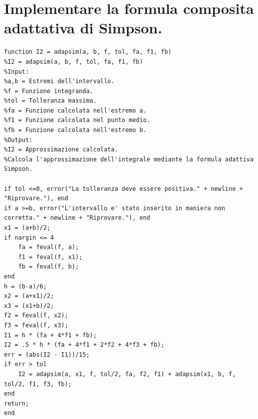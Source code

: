 \documentclass[10pt,a4paper]{article}
\begin{document}
\section{
  Implementare la formula composita adattativa di Simpson.
 }
\begin{lstlisting}[style=Matlab-editor]
function I2 = adapsim(a, b, f, tol, fa, f1, fb)
%I2 = adapsim(a, b, f, tol, fa, f1, fb)
%Input:
%a,b = Estremi dell'intervallo.
%f = Funzione integranda.
%tol = Tolleranza massima.
%fa = Funzione calcolata nell'estremo a.
%f1 = Funzione calcolata nel punto medio.
%fb = Funzione calcolata nell'estremo b.
%Output:
%I2 = Approssimazione calcolata.
%Calcola l'approssimazione dell'integrale mediante la formula adattiva Simpson.

if tol <=0, error("La tolleranza deve essere positiva." + newline + "Riprovare."), end
if a >=b, error("L'intervallo e' stato inserito in maniera non corretta." + newline + "Riprovare."), end
x1 = (a+b)/2;
if nargin <= 4
    fa = feval(f, a);
    f1 = feval(f, x1);
    fb = feval(f, b);
end
h = (b-a)/6;
x2 = (a+x1)/2;
x3 = (x1+b)/2;
f2 = feval(f, x2);
f3 = feval(f, x3);
I1 = h * (fa + 4*f1 + fb);
I2 = .5 * h * (fa + 4*f1 + 2*f2 + 4*f3 + fb);
err = (abs(I2 - I1))/15;
if err > tol
    I2 = adapsim(a, x1, f, tol/2, fa, f2, f1) + adapsim(x1, b, f, tol/2, f1, f3, fb);
end
return;
end  
\end{lstlisting}
\end{document}
